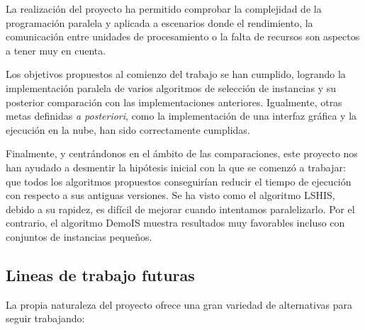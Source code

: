

La realización del proyecto ha permitido comprobar la complejidad de la programación paralela y aplicada a escenarios donde el rendimiento, la comunicación entre unidades de procesamiento o la falta de recursos son aspectos a tener muy en cuenta.

Los objetivos propuestos al comienzo del trabajo se han cumplido, logrando la implementación paralela de varios algoritmos de selección de instancias y su posterior comparación con las implementaciones anteriores. Igualmente, otras metas definidas \textit{a posteriori}, como la implementación de una interfaz gráfica y la ejecución en la nube, han sido correctamente cumplidas.

Finalmente, y centrándonos en el ámbito de las comparaciones, este proyecto nos han ayudado a desmentir la hipótesis inicial con la que se comenzó a trabajar: que todos los algoritmos propuestos conseguirían reducir el tiempo de ejecución con respecto a sus antiguas versiones. Se ha visto como el algoritmo LSHIS, debido a su rapidez, es difícil de mejorar cuando intentamos paralelizarlo. Por el contrario, el algoritmo DemoIS muestra resultados muy favorables incluso con conjuntos de instancias pequeños.


\subsection{Lineas de trabajo futuras}
La propia naturaleza del proyecto ofrece una gran variedad de alternativas para seguir trabajando:

